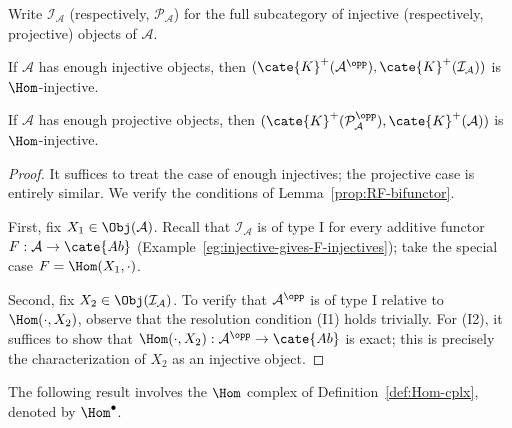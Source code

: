 \begin{lemma}\label{prop:RHom-bounded-prep}
	Write $\mathcal{I}_{\mathcal{A}}$ (respectively,
	$\mathcal{P}_{\mathcal{A}}$) for the full subcategory of injective
	(respectively, projective) objects of $\mathcal{A}$.
	\begin{compactitem}
		\item If $\mathcal{A}$ has enough injective objects, then
		$(\cate{K}^+(\mathcal{A}^{\opp}),
		\cate{K}^+(\mathcal{I}_{\mathcal{A}}))$ is $\Hom$-injective.
		\item If $\mathcal{A}$ has enough projective objects, then
		$(\cate{K}^+(\mathcal{P}_{\mathcal{A}}^{\opp}),
		\cate{K}^+(\mathcal{A}))$ is $\Hom$-injective.
	\end{compactitem}
\end{lemma}
\begin{proof}
	It suffices to treat the case of enough injectives; the projective case is
	entirely similar. We verify the conditions of
	Lemma~\ref{prop:RF-bifunctor}.

	First, fix $X_1\in\Obj(\mathcal{A})$. Recall that
	$\mathcal{I}_{\mathcal{A}}$ is of type I for every additive functor
	$F:\mathcal{A}\to\cate{Ab}$
	(Example~\ref{eg:injective-gives-F-injectives}); take the special case
	$F=\Hom(X_1,\cdot)$.

	Second, fix $X_2\in\Obj(\mathcal{I}_{\mathcal{A}})$. To verify that
	$\mathcal{A}^{\opp}$ is of type I relative to $\Hom(\cdot,X_2)$, observe
	that the resolution condition (I1) holds trivially. For (I2), it suffices to
	show that $\Hom(\cdot,X_2):\mathcal{A}^{\opp}\to\cate{Ab}$ is exact; this
	is precisely the characterization of $X_2$ as an injective object.
\end{proof}

The following result involves the $\Hom$ complex of
Definition~\ref{def:Hom-cplx}, denoted by $\Hom^\bullet$.

